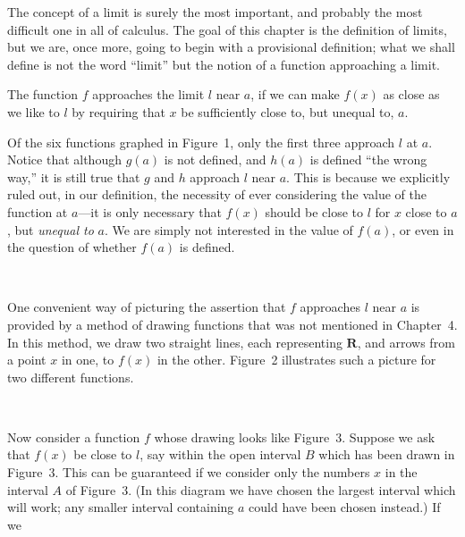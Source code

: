 
The concept of a limit is surely the most important, and probably the most
difficult one in all of calculus. The goal of this chapter is the definition of
limits, but we are, once more, going to begin with a provisional definition;
what we shall define is not the word ``limit'' but the notion of a function
approaching a limit.

\begin{spivakdefn}
The function $f$ approaches the limit $l$ near $a$, if we can make $f(x)$ as
close as we like to $l$ by requiring that $x$ be sufficiently close to, but
unequal to, $a$.
\end{spivakdefn}

Of the six functions graphed in Figure~1, only the first three approach $l$ at
$a$. Notice that although $g(a)$ is not defined, and $h(a)$ is defined ``the
wrong way,'' it is still true that $g$ and $h$ approach $l$ near $a$. This is
because we explicitly ruled out, in our definition, the necessity of ever
considering the value of the function at $a$---it is only necessary that $f(x)$
should be close to $l$ for $x$ close to $a$, but \emph{unequal to} $a$. We are
simply not interested in the value of $f(a)$, or even in the question of
whether $f(a)$ is defined.

\begin{center}
\\[0.6em]
\end{center}
One convenient way of picturing the assertion that $f$ approaches $l$ near $a$
is provided by a method of drawing functions that was not mentioned in
Chapter~4. In this method, we draw two straight lines, each representing
$\mathbf{R}$, and arrows from a point $x$ in one, to $f(x)$ in the other.
Figure~2 illustrates such a picture for two different functions.

\begin{center}
\\[0.6em]
\end{center}
Now consider a function $f$ whose drawing looks like Figure~3. Suppose we ask
that $f(x)$ be close to $l$, say within the open interval $B$ which has been
drawn in Figure~3. This can be guaranteed if we consider only the numbers $x$
in the interval $A$ of Figure~3. (In this diagram we have chosen the largest
interval which will work; any smaller interval containing $a$ could have been
chosen instead.) If we

